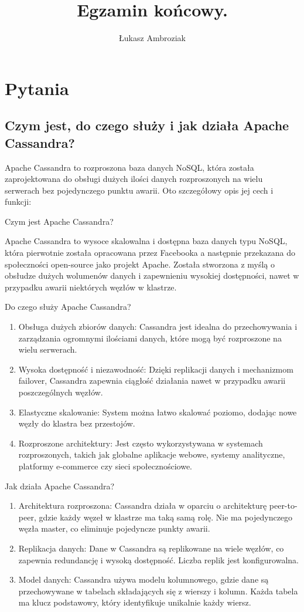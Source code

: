 \documentclass[10pt]{article}
\title{Egzamin końcowy.}
\author{Łukasz Ambroziak}
\begin{document}
\maketitle

\section{Pytania}

\subsection{Czym jest, do czego służy i jak działa Apache Cassandra?}

Apache Cassandra to rozproszona baza danych NoSQL, która została zaprojektowana do obsługi dużych ilości danych rozproszonych na wielu serwerach bez pojedynczego punktu awarii. Oto szczegółowy opis jej cech i funkcji:

Czym jest Apache Cassandra?

Apache Cassandra to wysoce skalowalna i dostępna baza danych typu NoSQL, która pierwotnie została opracowana przez Facebooka a następnie przekazana do społeczności open-source jako projekt Apache. Została stworzona z myślą o obsłudze dużych wolumenów danych i zapewnieniu wysokiej dostępności, nawet w przypadku awarii niektórych węzłów w klastrze.

Do czego służy Apache Cassandra?

\begin{enumerate}
  \item Obsługa dużych zbiorów danych: Cassandra jest idealna do przechowywania i zarządzania ogromnymi ilościami danych, które mogą być rozproszone na wielu serwerach.
  \item Wysoka dostępność i niezawodność: Dzięki replikacji danych i mechanizmom failover, Cassandra zapewnia ciągłość działania nawet w przypadku awarii poszczególnych węzłów.
  \item Elastyczne skalowanie: System można łatwo skalować poziomo, dodając nowe węzły do klastra bez przestojów.
  \item Rozproszone architektury: Jest często wykorzystywana w systemach rozproszonych, takich jak globalne aplikacje webowe, systemy analityczne, platformy e-commerce czy sieci społecznościowe.
\end{enumerate}

Jak działa Apache Cassandra?

\begin{enumerate}
  \item Architektura rozproszona: Cassandra działa w oparciu o architekturę peer-to-peer, gdzie każdy węzeł w klastrze ma taką samą rolę. Nie ma pojedynczego węzła master, co eliminuje pojedyncze punkty awarii.
  \item Replikacja danych: Dane w Cassandra są replikowane na wiele węzłów, co zapewnia redundancję i wysoką dostępność. Liczba replik jest konfigurowalna.
  \item Model danych: Cassandra używa modelu kolumnowego, gdzie dane są przechowywane w tabelach składających się z wierszy i kolumn. Każda tabela ma klucz podstawowy, który identyfikuje unikalnie każdy wiersz.
\end{enumerate}
\end{document}
